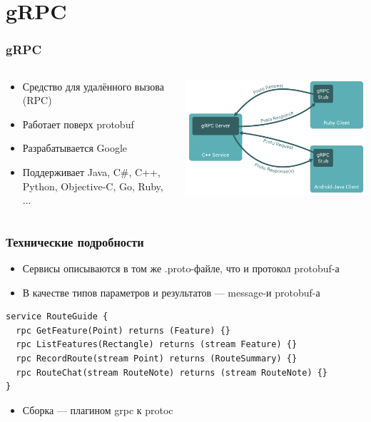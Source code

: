 \documentclass[xetex,mathserif,serif]{beamer}
\begin{document}
	\section{gRPC}

	\begin{frame}
		\frametitle{gRPC}
		\begin{columns}
			\begin{column}{0.6\textwidth}
				\begin{itemize}
					\item Средство для удалённого вызова (RPC)
					\item Работает поверх protobuf
					\item Разрабатывается Google
					\item Поддерживает Java, C\#, C++, Python,  Objective-C, Go, Ruby, ...
				\end{itemize}
			\end{column}
			\begin{column}{0.4\textwidth}
				\begin{center}
					\includegraphics[width=\textwidth]{grpc.png}
				\end{center}
			\end{column}
		\end{columns}
	\end{frame}

	\begin{frame}[fragile]
		\frametitle{Технические подробности}
		\begin{itemize}
			\item Сервисы описываются в том же .proto-файле, что и протокол protobuf-а
			\item В качестве типов параметров и результатов --- message-и protobuf-а
		\end{itemize}
		\begin{verbatim}
service RouteGuide {
  rpc GetFeature(Point) returns (Feature) {}
  rpc ListFeatures(Rectangle) returns (stream Feature) {}
  rpc RecordRoute(stream Point) returns (RouteSummary) {}
  rpc RouteChat(stream RouteNote) returns (stream RouteNote) {}
}
		\end{verbatim}
		\begin{itemize}
			\item Сборка --- плагином grpc к protoc
		\end{itemize}
	\end{frame}
\end{document}
